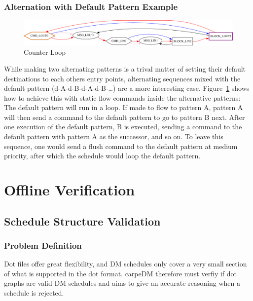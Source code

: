 \subsection{Alternation with Default Pattern Example}
%
\begin{figure}[H]
   \centering
   \def\svgwidth{1.0\textwidth}
   \includegraphics*[width=1.0\textwidth,keepaspectratio]{Figures/excntloop}
   \caption{ Counter Loop }
   \label{fig:excntloop}
\end{figure}


While making two alternating patterns is a trival matter of setting their default destinations to each others entry points,
alternating sequences mixed with the default pattern (d-A-d-B-d-A-d-B-\dots) are a more interesting case.
Figure~\ref{fig:excntloop} shows how to achieve this with static flow commands inside the alternative patterns:
The default pattern will run in a loop. If made to flow to pattern A, pattern A will then send a command to the default pattern to go to pattern B next.
After one execution of the default pattern, B is executed, sending a command to the default pattern with pattern A as the successor, and so on.
To leave this sequence, one would send a flush command to the default pattern at medium priority, after which the schedule would loop the default pattern.


\chapter{Offline Verification}





\section{Schedule Structure Validation}

\subsection{Problem Definition}
Dot files offer great flexibility, and DM schedules only cover a very small section of what is supported in the dot format. carpeDM therefore must verfiy if dot graphs
are valid DM schedules and aims to give an accurate reasoning when a schedule is rejected.

